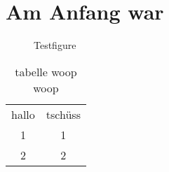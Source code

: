 \chapter{Am Anfang war}

\lipsum[10]
\begin{figure}
	\caption{Testfigure}
	\label{fig:test}
\end{figure}

\begin{table}
	\caption{tabelle woop woop}
	\label{tb:one}
	\begin{tabular}{cc}
		hallo & tschüss \\
		1 & 1 \\
		2 & 2 \\
	\end{tabular}
\end{table}
\lipsum[50-65]
